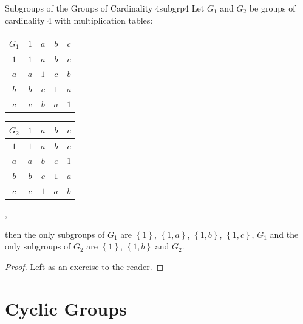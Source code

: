 \documentclass[math]{amznotes}
\theoremstyle{remark}
\newcommand{\0}{\mathbf{0}}
\newcommand{\1}{\mathbf{1}}
\begin{document}
\begin{probox}{Subgroups of the Groups of Cardinality $4$}{subgrp4}
    Let $G_1$ and $G_2$ be groups of cardinality $4$ with multiplication tables:
    \begin{center}
        \begin{tabular}{c|cccc}
            $G_1$ & $1$ & $a$ & $b$ & $c$ \\
            \hline
            $1$ & $1$ & $a$ & $b$ & $c$ \\
            $a$ & $a$ & $1$ & $c$ & $b$ \\
            $b$ & $b$ & $c$ & $1$ & $a$ \\
            $c$ & $c$ & $b$ & $a$ & $1$
        \end{tabular}\quad
        \begin{tabular}{c|cccc}
            $G_2$ & $1$ & $a$ & $b$ & $c$ \\
            \hline
            $1$ & $1$ & $a$ & $b$ & $c$ \\
            $a$ & $a$ & $b$ & $c$ & $1$ \\
            $b$ & $b$ & $c$ & $1$ & $a$ \\
            $c$ & $c$ & $1$ & $a$ & $b$
        \end{tabular},
    \end{center}
    then the only subgroups of $G_1$ are $\left\{1\right\}$, $\left\{1, a\right\}$, $\left\{1, b\right\}$, $\left\{1, c\right\}$, $G_1$ and the only subgroups of $G_2$ are $\left\{1\right\}$, $\left\{1, b\right\}$ and $G_2$.
    \tcblower
    \begin{proof}
        Left as an exercise to the reader.
    \end{proof}
\end{probox}

\chapter{Cyclic Groups}
\end{document}
